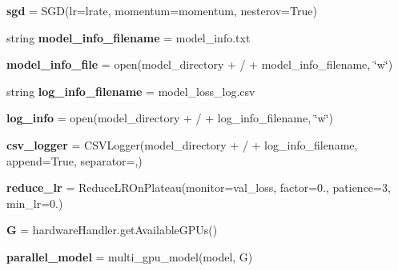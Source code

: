 \begin{DoxyCompactItemize}
{\bfseries sgd} = S\+GD(lr=lrate, momentum=momentum, nesterov=True)
\item 
\mbox{\label{namespaceTrainModels2_ad443a27f3cf22ff208d54a951218e8e3}} 
string {\bfseries model\+\_\+info\+\_\+filename} = \textquotesingle{}model\+\_\+info.\+txt\textquotesingle{}
\item 
\mbox{\label{namespaceTrainModels2_a1ecbcc573dc5f3d1f621ff6498a345fb}} 
{\bfseries model\+\_\+info\+\_\+file} = open(model\+\_\+directory + \textquotesingle{}/\textquotesingle{} + model\+\_\+info\+\_\+filename, \char`\"{}w\char`\"{})
\item 
\mbox{\label{namespaceTrainModels2_a1df71d4638f54ccc7db48422d4c054ab}} 
string {\bfseries log\+\_\+info\+\_\+filename} = \textquotesingle{}model\+\_\+loss\+\_\+log.\+csv\textquotesingle{}
\item 
\mbox{\label{namespaceTrainModels2_a87353c150623c98362c8945361351f1f}} 
{\bfseries log\+\_\+info} = open(model\+\_\+directory + \textquotesingle{}/\textquotesingle{} + log\+\_\+info\+\_\+filename, \char`\"{}w\char`\"{})
\item 
\mbox{\label{namespaceTrainModels2_a58908e94f77f753e7ae808625c45442f}} 
{\bfseries csv\+\_\+logger} = C\+S\+V\+Logger(model\+\_\+directory + \textquotesingle{}/\textquotesingle{} + log\+\_\+info\+\_\+filename, append=True, separator=\textquotesingle{},\textquotesingle{})
\item 
\mbox{\label{namespaceTrainModels2_a90523e6e2253a1ae9c7c81408a2a53d3}} 
{\bfseries reduce\+\_\+lr} = Reduce\+L\+R\+On\+Plateau(monitor=\textquotesingle{}val\+\_\+loss\textquotesingle{}, factor=0., patience=3, min\+\_\+lr=0.)
\item 
\mbox{\label{namespaceTrainModels2_a6ba3b54f49e6d977b7709247f8adef5a}} 
{\bfseries G} = hardware\+Handler.\+get\+Available\+G\+P\+Us()
\item 
\mbox{\label{namespaceTrainModels2_a2aaa47f5ae35874c42fb780cfba7c54f}} 
{\bfseries parallel\+\_\+model} = multi\+\_\+gpu\+\_\+model(model, G)

\end{DoxyCompactItemize}
